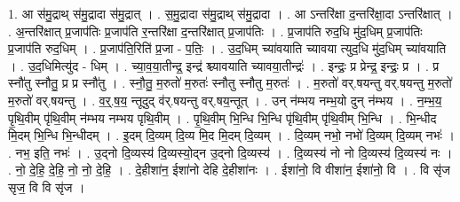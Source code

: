 \documentclass[17pt]{extarticle}
\begin{document}
1. आ स॑मु॒द्राथ् स॑मु॒द्रादा स॑मु॒द्रात् । . स॒मु॒द्रादा स॑मु॒द्राथ् स॑मु॒द्रादा । . आ ऽन्तरि॑क्षा द॒न्तरि॑क्षा॒दा ऽन्तरि॑क्षात् । . अ॒न्तरि॑क्षात् प्र॒जाप॑तिः प्र॒जाप॑ति र॒न्तरि॑क्षा द॒न्तरि॑क्षात् प्र॒जाप॑तिः । . प्र॒जाप॑ति रुद॒धि मु॑द॒धिम् प्र॒जाप॑तिः प्र॒जाप॑ति रुद॒धिम् । . प्र॒जाप॑ति॒रिति॑ प्र॒जा - प॒तिः॒ । . उ॒द॒धिम् च्या॑वयाति च्यावया त्युद॒धि मु॑द॒धिम् च्या॑वयाति । . उ॒द॒धिमित्यु॑द - धिम् । . च्या॒व॒या॒तीन्द्र॒ इन्द्र॑ श्च्यावयाति च्यावया॒तीन्द्रः॑ । . इन्द्रः॒ प्र प्रेन्द्र॒ इन्द्रः॒ प्र । . प्र स्नौ॑तु स्नौतु॒ प्र प्र स्नौ॑तु । . स्नौ॒तु॒ म॒रुतो॑ म॒रुतः॑ स्नौतु स्नौतु म॒रुतः॑ । . म॒रुतो॑ वर्.षयन्तु वर्.षयन्तु म॒रुतो॑ म॒रुतो॑ वर्.षयन्तु । . व॒र्॒.ष॒य॒ न्तूदुद् व॑र्.षयन्तु वर्.षय॒न्तूत् । . उन् न॑म्भय नम्भ॒यो दुन् न॑म्भय । . न॒म्भ॒य॒ पृ॒थि॒वीम् पृ॑थि॒वीम् न॑म्भय नम्भय पृथि॒वीम् । . पृ॒थि॒वीम् भि॒न्धि भि॒न्धि पृ॑थि॒वीम् पृ॑थि॒वीम् भि॒न्धि । . भि॒न्धीद मि॒दम् भि॒न्धि भि॒न्धीदम् । . इ॒दम् दि॒व्यम् दि॒व्य मि॒द मि॒दम् दि॒व्यम् । . दि॒व्यम् नभो॒ नभो॑ दि॒व्यम् दि॒व्यम् नभः॑ । . नभ॒ इति॒ नभः॑ । . उ॒द्नो दि॒व्यस्य॑ दि॒व्यस्यो॒द्न उ॒द्नो दि॒व्यस्य॑ । . दि॒व्यस्य॑ नो नो दि॒व्यस्य॑ दि॒व्यस्य॑ नः । . नो॒ दे॒हि॒ दे॒हि॒ नो॒ नो॒ दे॒हि॒ । . दे॒हीशा॑न॒ ईशा॑नो देहि दे॒हीशा॑नः । . ईशा॑नो॒ वि वीशा॑न॒ ईशा॑नो॒ वि । . वि सृ॑ज सृज॒ वि वि सृ॑ज । \newline
\end{document}
